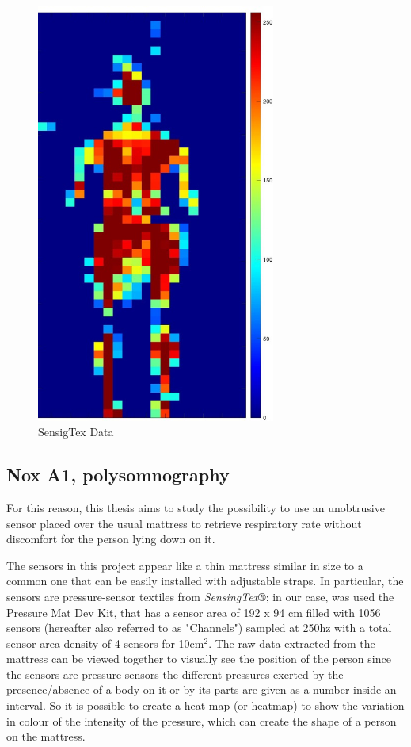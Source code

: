 \vspace*{0.5cm}
\begin{figure}[H]
    \centering
    \includegraphics[width=0.7\textwidth]{img/sensingtex_2.jpg}
    \caption{SensigTex Data}
    \label{fig:sensingtexData}
\end{figure}
\vspace*{0.5cm}


\subsection{Nox A1, polysomnography} \label{NOXA1}
For this reason, this thesis aims to study the possibility to use an unobtrusive sensor placed over the usual mattress to retrieve 
respiratory rate without discomfort for the person lying down on it. 


The sensors in this project appear like a thin mattress similar in size to a common one that can be easily installed with adjustable straps.
In particular, the sensors are pressure-sensor textiles from \textit{SensingTex®}; in our case, was used the Pressure Mat Dev Kit,
 that has a sensor area of 192 x 94 cm filled with 1056 sensors (hereafter also referred to as "Channels") sampled at 250hz
 with a total sensor area density of 4 sensors for 10cm$^2$.
 The raw data extracted from the mattress can be viewed together to visually see the position of the person since the sensors are pressure sensors
the different pressures exerted by the presence/absence of a body on it or by its parts are given as a number inside an interval. 
So it is possible to create a heat map (or heatmap) to show the variation in colour of the intensity of the pressure, which can create the shape of
a person on the mattress.

